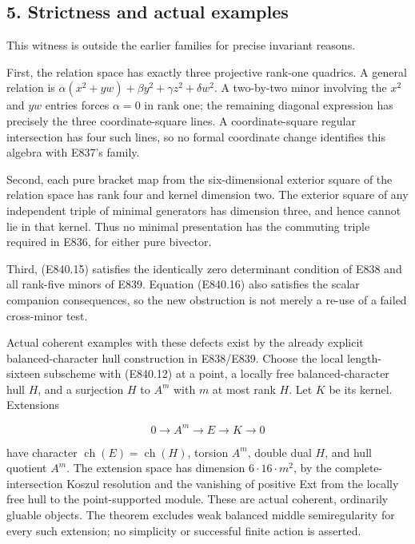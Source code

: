 \subsection{5. Strictness and actual
examples}\label{strictness-and-actual-examples}

This witness is outside the earlier families for precise invariant
reasons.

First, the relation space has exactly three projective rank-one
quadrics. A general relation is
\(\alpha(x^2+yw)+\beta y^2+\gamma z^2+\delta w^2\). A two-by-two minor
involving the \(x^2\) and \(yw\) entries forces \(\alpha=0\) in rank
one; the remaining diagonal expression has precisely the three
coordinate-square lines. A coordinate-square regular intersection has
four such lines, so no formal coordinate change identifies this algebra
with E837's family.

Second, each pure bracket map from the six-dimensional exterior square
of the relation space has rank four and kernel dimension two. The
exterior square of any independent triple of minimal generators has
dimension three, and hence cannot lie in that kernel. Thus no minimal
presentation has the commuting triple required in E836, for either pure
bivector.

Third, (E840.15) satisfies the identically zero determinant condition of
E838 and all rank-five minors of E839. Equation (E840.16) also satisfies
the scalar companion consequences, so the new obstruction is not merely
a re-use of a failed cross-minor test.

Actual coherent examples with these defects exist by the already
explicit balanced-character hull construction in E838/E839. Choose the
local length-sixteen subscheme with (E840.12) at a point, a locally free
balanced-character hull \(H\), and a surjection \(H\) to \(A^m\) with
\(m\) at most rank \(H\). Let \(K\) be its kernel. Extensions

\[
                      0\longrightarrow A^m
                      \longrightarrow E\longrightarrow K
                      \longrightarrow0
 \tag{E840.18}
\]

have character \(\operatorname{ch}(E)=\operatorname{ch}(H)\), torsion
\(A^m\), double dual \(H\), and hull quotient \(A^m\). The extension
space has dimension \(6\cdot16\cdot m^2\), by the complete-intersection
Koszul resolution and the vanishing of positive Ext from the locally
free hull to the point-supported module. These are actual coherent,
ordinarily gluable objects. The theorem excludes weak balanced middle
semiregularity for every such extension; no simplicity or successful
finite action is asserted.

